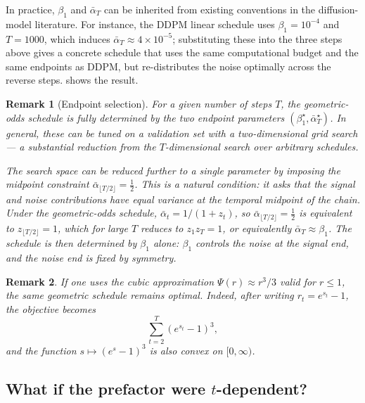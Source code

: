 \documentclass[11pt]{article}
\newcommand{\PsiFn}{\Psi}
\newtheorem{remark}{Remark}
\begin{document}
In practice, \(\beta_1\) and \(\bar\alpha_T\) can be  inherited from existing conventions in the diffusion-model literature. For instance, the DDPM linear schedule \cite{ho2020denoising} uses \(\beta_1=10^{-4}\) and \(T=1000\), which induces \(\bar\alpha_T\approx 4\times 10^{-5}\); substituting these into the three steps above gives a concrete schedule that uses the same computational budget and the same endpoints as DDPM, but re-distributes the noise optimally across the reverse steps.  shows the result.

\begin{remark}[Endpoint selection]
\label{rem:endpoint_selection}
For a given number of steps \(T\), the geometric-odds schedule is fully determined by the two endpoint parameters \((\beta_1^\star,\bar\alpha_T^\star)\). In general, these can be tuned on a validation set with a two-dimensional grid search --- a substantial reduction from the \(T\)-dimensional search over arbitrary schedules.

The search space can be reduced further to a single parameter by imposing the midpoint constraint \(\bar\alpha_{\lfloor T/2\rfloor}=\tfrac12\). This is a natural condition: it asks that the signal and noise contributions have equal variance at the temporal midpoint of the chain. Under the geometric-odds schedule, \(\bar\alpha_t=1/(1+z_t)\), so \(\bar\alpha_{\lfloor T/2\rfloor}=\tfrac12\) is equivalent to \(z_{\lfloor T/2\rfloor}=1\), which for large \(T\) reduces to \(z_1 z_T=1\), or equivalently \(\bar\alpha_T\approx \beta_1\). The schedule is then determined by \(\beta_1\) alone: \(\beta_1\) controls the noise at the signal end, and the noise end is fixed by symmetry.
\end{remark}

\begin{remark}
\label{rem:cubic_same_minimizer}
If one uses the cubic approximation \(\PsiFn(r)\approx r^3/3\) valid for \(r\le 1\), the same geometric schedule remains optimal. Indeed, after writing \(r_t=e^{s_t}-1\), the objective becomes
\[
\sum_{t=2}^T (e^{s_t}-1)^3,
\]
and the function \(s\mapsto (e^s-1)^3\) is also convex on \([0,\infty)\).
\end{remark}

\subsection{What if the prefactor were \texorpdfstring{$t$}{t}-dependent?}
\label{sec:t_dependent_prefactor}
\end{document}
